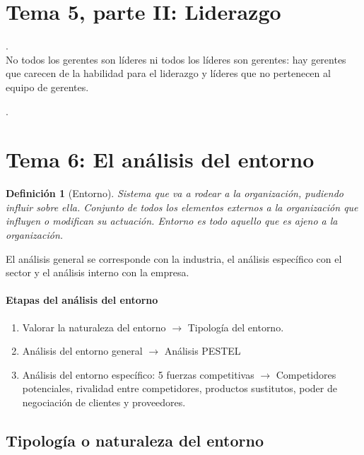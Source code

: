 \documentclass[12pt]{article}
\theoremstyle{definition_wo_parentheses}
\newtheorem{definicion}{Definición}[section]
\begin{document}
\section{Tema 5, parte II: Liderazgo}
.\\

No todos los gerentes son líderes ni todos los líderes son gerentes: hay gerentes que carecen de la habilidad para el liderazgo y líderes que no pertenecen al equipo de gerentes.

.\\


\section{Tema 6: El análisis del entorno}

\begin{definicion}[Entorno]
	Sistema que va a rodear a la organización, pudiendo influir sobre ella. Conjunto de todos los elementos externos a la organización que influyen o modifican su actuación. Entorno es todo aquello que es ajeno a la organización.
\end{definicion}

	El análisis general se corresponde con la industria, el análisis específico con el sector y el análisis interno con la empresa.

\paragraph{Etapas del análisis del entorno}
\begin{enumerate}
\item Valorar la naturaleza del entorno $\rightarrow$ Tipología del entorno.
\item Análisis del entorno general $\rightarrow$ Análisis PESTEL
\item Análisis del entorno específico: 5 fuerzas competitivas $\rightarrow$ Competidores potenciales, rivalidad entre competidores, productos sustitutos, poder de negociación de clientes y proveedores.
\end{enumerate}

\subsection{Tipología  o naturaleza del entorno}
\end{document}
